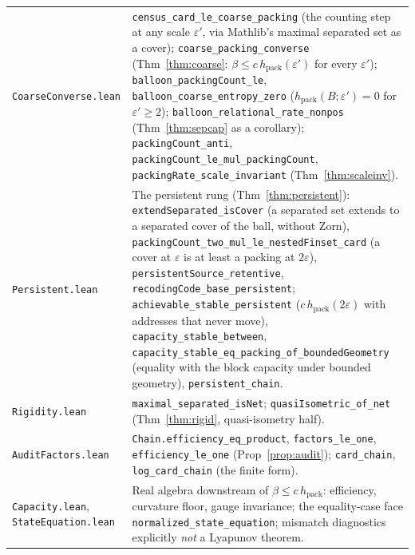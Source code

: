 \documentclass[11pt,reqno]{amsart}
\theoremstyle{plain}
\theoremstyle{definition}
\newcommand{\hpack}{h_{\mathrm{pack}}}
\newcommand{\eps}{\varepsilon}
\begin{document}
{\begin{longtable}{@{}>{\raggedright\arraybackslash}p{3.9cm}>{\raggedright\arraybackslash}p{9.7cm}@{}}
\texttt{CoarseConverse.lean} & \texttt{census\_\allowbreak{}card\_\allowbreak{}le\_\allowbreak{}coarse\_\allowbreak{}packing} (the counting step at any scale $\eps'$, via Mathlib's maximal separated set as a cover); \texttt{coarse\_\allowbreak{}packing\_\allowbreak{}converse} (Thm~\ref{thm:coarse}: $\beta\le c\,\hpack(\eps')$ for every $\eps'$); \texttt{balloon\_\allowbreak{}packingCount\_\allowbreak{}le}, \texttt{balloon\_\allowbreak{}coarse\_\allowbreak{}entropy\_\allowbreak{}zero} ($\hpack(B;\eps')=0$ for $\eps'\ge2$); \texttt{balloon\_\allowbreak{}relational\_\allowbreak{}rate\_\allowbreak{}nonpos} (Thm~\ref{thm:sepcap} as a corollary); \texttt{packingCount\_\allowbreak{}anti}, \texttt{packingCount\_\allowbreak{}le\_\allowbreak{}mul\_\allowbreak{}packingCount}, \texttt{packingRate\_\allowbreak{}scale\_\allowbreak{}invariant} (Thm~\ref{thm:scaleinv}). \\
\texttt{Persistent.lean} & The persistent rung (Thm~\ref{thm:persistent}): \texttt{extendSeparated\_\allowbreak{}isCover} (a separated set extends to a separated cover of the ball, without Zorn), \texttt{packingCount\_\allowbreak{}two\_\allowbreak{}mul\_\allowbreak{}le\_\allowbreak{}nestedFinset\_\allowbreak{}card} (a cover at $\eps$ is at least a packing at $2\eps$), \texttt{persistentSource\_\allowbreak{}retentive}, \texttt{recodingCode\_\allowbreak{}base\_\allowbreak{}persistent}; \texttt{achievable\_\allowbreak{}stable\_\allowbreak{}persistent} ($c\,\hpack(2\eps)$ with addresses that never move), \texttt{capacity\_\allowbreak{}stable\_\allowbreak{}between}, \texttt{capacity\_\allowbreak{}stable\_\allowbreak{}eq\_\allowbreak{}packing\_\allowbreak{}of\_\allowbreak{}boundedGeometry} (equality with the block capacity under bounded geometry), \texttt{persistent\_\allowbreak{}chain}. \\
\texttt{Rigidity.lean} & \texttt{maximal\_\allowbreak{}separated\_\allowbreak{}isNet}; \texttt{quasiIsometric\_\allowbreak{}of\_\allowbreak{}net} (Thm~\ref{thm:rigid}, quasi-isometry half). \\
\texttt{AuditFactors.lean} & \texttt{Chain.efficiency\_\allowbreak{}eq\_\allowbreak{}product}, \texttt{factors\_\allowbreak{}le\_\allowbreak{}one}, \texttt{efficiency\_\allowbreak{}le\_\allowbreak{}one} (Prop~\ref{prop:audit}); \texttt{card\_\allowbreak{}chain}, \texttt{log\_\allowbreak{}card\_\allowbreak{}chain} (the finite form). \\
\texttt{Capacity.lean}, \texttt{StateEquation.lean} & Real algebra downstream of $\beta\le c\,\hpack$: efficiency, curvature floor, gauge invariance; the equality-case face \texttt{normalized\_\allowbreak{}state\_\allowbreak{}equation}; mismatch diagnostics explicitly \emph{not} a Lyapunov theorem. \\

\end{longtable}}
\end{document}

